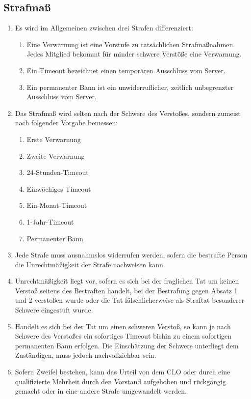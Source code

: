 \documentclass{article}
\begin{document}
\subsection{Strafmaß}
\begin{enumerate}[(1)]
	\item Es wird im Allgemeinen zwischen drei Strafen differenziert:
	\begin{enumerate}[1.]
		\item Eine Verwarnung ist eine Vorstufe zu tatsächlichen Strafmaßnahmen. Jedes Mitglied bekommt für minder schwere Verstöße eine Verwarnung.
		\item Ein Timeout bezeichnet einen temporären Ausschluss vom Server.
		\item Ein permanenter Bann ist ein unwiderruflicher, zeitlich unbegrenzter Ausschluss vom Server.
	\end{enumerate}
	\item Das Strafmaß wird selten nach der Schwere des Verstoßes, sondern zumeist nach folgender Vorgabe bemessen:
	\begin{enumerate}[1.]
		\item Erste Verwarnung
		\item Zweite Verwarnung
		\item 24-Stunden-Timeout
		\item Einwöchiges Timeout
		\item Ein-Monat-Timeout
		\item 1-Jahr-Timeout
		\item Permanenter Bann
	\end{enumerate}
	\item Jede Strafe muss ausnahmslos widerrufen werden, sofern die bestrafte Person die Unrechtmäßigkeit der Strafe nachweisen kann.
	\item Unrechtmäßigkeit liegt vor, sofern es sich bei der fraglichen Tat um keinen Verstoß seitens des Bestraften handelt, bei der Bestrafung gegen Absatz 1 und 2 verstoßen wurde oder die Tat fälschlicherweise als Straftat besonderer Schwere eingestuft wurde.
	\item Handelt es sich bei der Tat um einen schweren Verstoß, so kann je nach Schwere des Verstoßes ein sofortiges Timeout bishin zu einem sofortigen permanenten Bann erfolgen. Die Einschätzung der Schwere unterliegt dem Zuständigen, muss jedoch nachvollziehbar sein. 
	\item Sofern Zweifel bestehen, kann das Urteil von dem CLO oder durch eine qualifizierte Mehrheit durch den Vorstand aufgehoben und rückgängig gemacht oder in eine andere Strafe umgewandelt werden.

\end{enumerate}
\end{document}
